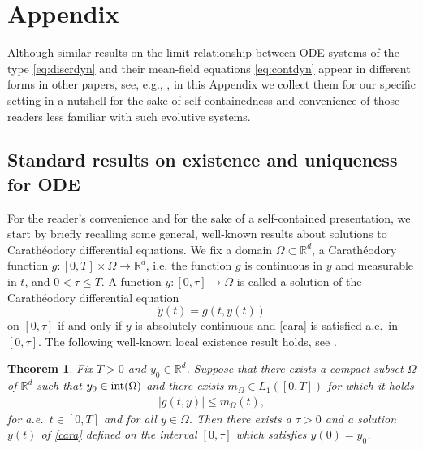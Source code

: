 \documentclass[A4paper,11pt]{article}
\newtheorem{theorem}{Theorem}[section]
\theoremstyle{definition}
\newcommand{\R}{\mathbb{R}}
\begin{document}
\section{Appendix}

 Although  similar results on the limit relationship between ODE systems of the type \eqref{eq:discrdyn} and their mean-field equations \eqref{eq:contdyn}
appear in different forms in other papers, see, e.g., \cite{AGS,CanCarRos10,13-Carrillo-Choi-Hauray-MFL,MFOC}, in this Appendix we collect them for our specific setting in a nutshell for the sake of self-containedness and convenience of those readers less familiar with such evolutive systems.

\subsection{Standard results on existence and uniqueness for ODE}\label{ap00}

For the reader's convenience and for the sake of a self-contained presentation, we start by briefly recalling some general, well-known results about solutions to Carath{\'e}odory differential equations. We fix a domain $\Omega \subset \R^d$, a Carath{\'e}odory function $g\colon[0,T]\times \Omega \to \R^d$, i.e. the function $g$ is continuous in $y$ and measurable in $t$, and $0<\tau \le T$. A function $y\colon [0,\tau]\to \Omega$ is called a solution of the Carath{\'e}odory differential equation
\begin{equation}\label{cara}
\dot y(t)=g(t, y(t))
\end{equation}
on $[0,\tau]$ if and only if $y$ is absolutely continuous and \eqref{cara} is satisfied a.e.\ in $[0,\tau]$.
The following well-known local existence result holds, see \cite[Chapter 1, Theorem 1]{Fil} .


\begin{theorem}\label{cara-local}
Fix $T > 0$ and $y_0 \in \R^d$. Suppose that there exists a compact subset $\Omega$ of $\R^d$ such that $y_0 \in \textup{int}(\Omega)$ and there exists $m_{\Omega} \in L_1([0,T])$ for which it holds
\begin{align}\label{l1}
|g(t,y)|\le m_{\Omega}(t),
\end{align}
for a.e.\ $t \in [0,T]$ and for all $y \in \Omega$. Then there exists a $\tau > 0$ and a solution $y(t)$ of \eqref{cara} defined on the interval $[0,\tau]$ which satisfies $y(0)=y_0$. 
\end{theorem}
\end{document}

